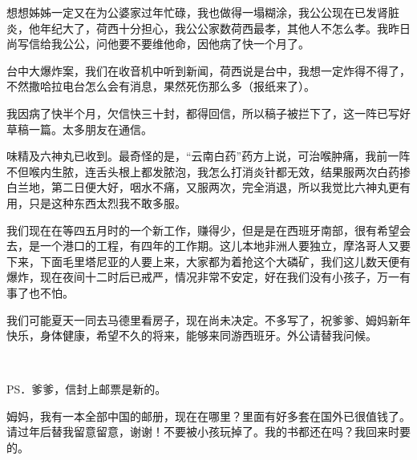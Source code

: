 \par 想想姊姊一定又在为公婆家过年忙碌，我也做得一塌糊涂，我公公现在已发肾脏炎，他年纪大了，荷西十分担心，我公公家数荷西最孝，其他人不怎么孝。我昨日尚写信给我公公，问他要不要维他命，因他病了快一个月了。
\par 台中大爆炸案，我们在收音机中听到新闻，荷西说是台中，我想一定炸得不得了，不然撒哈拉电台怎么会有消息，果然死伤那么多（报纸来了）。
\par 我因病了快半个月，欠信快三十封，都得回信，所以稿子被拦下了，这一阵已写好草稿一篇。太多朋友在通信。
\par 味精及六神丸已收到。最奇怪的是，“云南白药”药方上说，可治喉肿痛，我前一阵不但喉内生脓，连舌头根上都发脓泡，我怎么打消炎针都无效，结果服两次白药掺白兰地，第二日便大好，咽水不痛，又服两次，完全消退，所以我觉比六神丸更有用，只是这种东西太烈我不敢多服。
\par 我们现在在等四五月时的一个新工作，赚得少，但是是在西班牙南部，很有希望会去，是一个港口的工程，有四年的工作期。这儿本地非洲人要独立，摩洛哥人又要下来，下面毛里塔尼亚的人要上来，大家都为着抢这个大磷矿，我们这儿数天便有爆炸，现在夜间十二时后已戒严，情况非常不安定，好在我们没有小孩子，万一有事了也不怕。
\par 我们可能夏天一同去马德里看房子，现在尚未决定。不多写了，祝爹爹、姆妈新年快乐，身体健康，希望不久的将来，能够来同游西班牙。外公请替我问候。
\par {}
\par  
\par PS．爹爹，信封上邮票是新的。
\par 姆妈，我有一本全部中国的邮册，现在在哪里？里面有好多套在国外已很值钱了。请过年后替我留意留意，谢谢！不要被小孩玩掉了。我的书都还在吗？我回来时要的。





